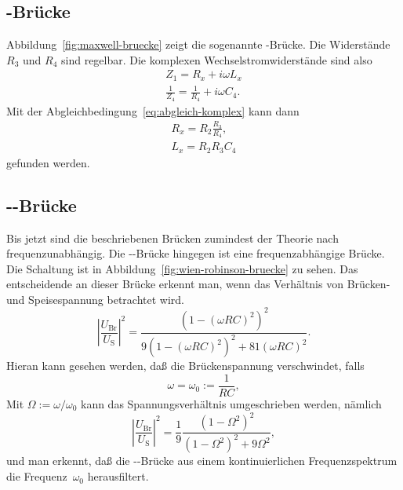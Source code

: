 \subsection{-Brücke}
Abbildung~\ref{fig:maxwell-bruecke} zeigt die sogenannte
-Brücke. Die Widerstände $R_3$ und $R_4$ sind regelbar.
Die komplexen Wechselstromwiderstände sind also
\begin{gather}
Z_1 = R_x + i \omega L_x\\
\frac{1}{Z_4} = \frac{1}{R_4} + i \omega C_4.
\end{gather}
Mit der Abgleichbedingung~\eqref{eq:abgleich-komplex} kann dann
\begin{gather}
\label{eq:abgleich-ind-maxwell}
R_x = R_2 \frac{R_3}{R_4},\\
L_x = R_2 R_3 C_4
\end{gather}
gefunden werden.

\subsection{--Brücke}

Bis jetzt sind die beschriebenen Brücken zumindest der Theorie nach
frequenzunabhängig. Die --Brücke hingegen
ist eine frequenzabhängige Brücke. Die Schaltung ist in
Abbildung~\ref{fig:wien-robinson-bruecke} zu sehen. Das entscheidende
an dieser Brücke erkennt man, wenn das Verhältnis von Brücken- und
Speisespannung betrachtet wird.
\begin{equation}
\left|\frac{U_\text{Br}}{U_\text{S}}\right|^2 = \frac{(1 - (\omega R
  C)^2)^2}{9(1 - (\omega R C)^2)^2 + 81 (\omega R C)^2}.
\end{equation}
Hieran kann gesehen werden, daß die Brückenspannung verschwindet,
falls 
\begin{equation}
\omega = \omega_0 := \frac{1}{RC}, 
\end{equation}
Mit $\Omega := \omega/\omega_0$ kann das Spannungsverhältnis
umgeschrieben werden, nämlich
\begin{equation}
\label{eq:wien_robinson_theo}
\left|\frac{U_\text{Br}}{U_\text{S}}\right|^2 = \frac{1}{9} \frac{(1 -
  \Omega^2)^2}{(1 - \Omega^2)^2 + 9 \Omega^2},
\end{equation}
und man erkennt, daß die --Brücke aus einem
kontinuierlichen Frequenzspektrum die Frequenz~$\omega_0$
herausfiltert.

